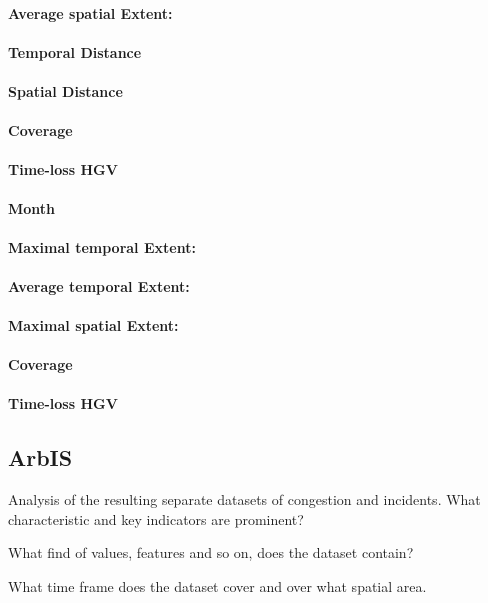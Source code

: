 \paragraph{Average spatial Extent:}
\paragraph{Temporal Distance}
\paragraph{Spatial Distance}
\paragraph{Coverage}
\paragraph{Time-loss HGV}

\large
\centerline{\textbf{Month}}
\normalsize

\paragraph{Maximal temporal Extent:}
\paragraph{Average temporal Extent:}
\paragraph{Maximal spatial Extent:}
\paragraph{Coverage}
\paragraph{Time-loss HGV}

\subsection{ArbIS}

Analysis of the resulting separate datasets of congestion and incidents. What characteristic and key indicators are prominent?

What find of values, features and so on, does the dataset contain?

What time frame does the dataset cover and over what spatial area.

